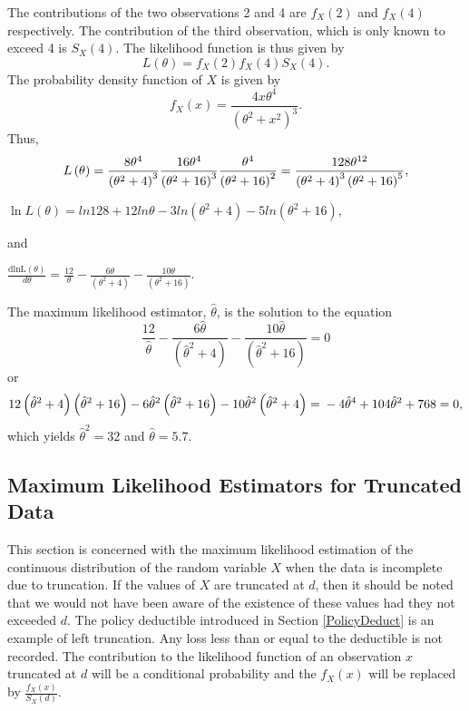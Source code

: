 \documentclass[]{book}
\begin{document}
The contributions of the two observations 2 and 4 are
\(f_{X}\left( 2 \right)\) and \(f_{X}\left( 4 \right)\) respectively.
The contribution of the third observation, which is only known to exceed
4 is \(S_{X}\left( 4 \right)\). The likelihood function is thus given by
\[L\left( \theta \right) = f_{X}\left( 2 \right)f_{X}\left( 4 \right)S_{X}\left( 4 \right).\]
The probability density function of \(X\) is given by
\[f_{X}\left( x \right) = \frac{4x\theta^{4}}{\left( \theta^{2} + x^{2} \right)^{3}}.\]
Thus,
\[L\left( \theta \right) = \frac{8\theta^{4}}{\left( \theta^{2} + 4 \right)^{3}}\frac{16\theta^{4}}{\left( \theta^{2} + 16 \right)^{3}}\frac{\theta^{4}}{\left( \theta^{2} + 16 \right)^{2}} = \\
\frac{128\theta^{12}}{\left( \theta^{2} + 4 \right)^{3}\left( \theta^{2} + 16 \right)^{5}},\]

\(\ln L\left( \theta \right) = ln128 + 12ln\theta - 3ln\left( \theta^{2} + 4 \right) - 5ln\left( \theta^{2} + 16 \right)\),

and

\(\frac{\text{dlnL}\left( \theta \right)}{d \theta} = \frac{12}{\theta} - \frac{6\theta}{\left( \theta^{2} + 4 \right)} - \frac{10\theta}{\left( \theta^{2} + 16 \right)}\).

The maximum likelihood estimator, \(\hat{\theta}\), is the solution to
the equation
\[\frac{12}{\hat{\theta}} - \frac{6\hat{\theta}}{\left( {\hat{\theta}}^{2} + 4 \right)} - \frac{10\hat{\theta}}{\left( {\hat{\theta}}^{2} + 16 \right)} = 0\]
or
\[12\left( {\hat{\theta}}^{2} + 4 \right)\left( {\hat{\theta}}^{2} + 16 \right) - 6{\hat{\theta}}^{2}\left( {\hat{\theta}}^{2} + 16 \right) - 10{\hat{\theta}}^{2}\left( {\hat{\theta}}^{2} + 4 \right) = \\
- 4{\hat{\theta}}^{4} + 104{\hat{\theta}}^{2} + 768 = 0,\] which yields
\({\hat{\theta}}^{2} = 32\) and \(\hat{\theta} = 5.7\).

\subsection{Maximum Likelihood Estimators for Truncated
Data}\label{maximum-likelihood-estimators-for-truncated-data}

This section is concerned with the maximum likelihood estimation of the
continuous distribution of the random variable \(X\) when the data is
incomplete due to truncation. If the values of \(X\) are truncated at
\(d\), then it should be noted that we would not have been aware of the
existence of these values had they not exceeded \(d\). The policy
deductible introduced in Section \ref{PolicyDeduct} is an example of
left truncation. Any loss less than or equal to the deductible is not
recorded. The contribution to the likelihood function of an observation
\(x\) truncated at \(d\) will be a conditional probability and the
\(f_{X}\left( x \right)\) will be replaced by
\(\frac{f_{X}\left( x \right)}{S_{X}\left( d \right)}\).
\end{document}
